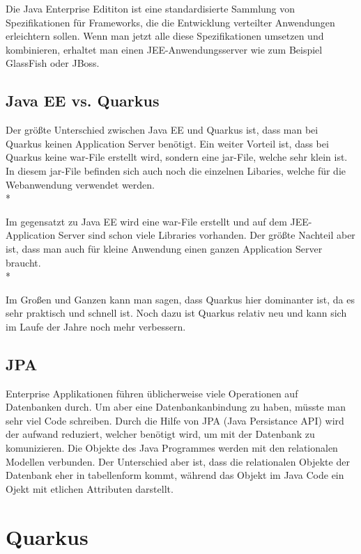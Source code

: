 Die Java Enterprise Edititon ist eine standardisierte Sammlung von Spezifikationen für Frameworks, die die Entwicklung verteilter Anwendungen erleichtern sollen.
Wenn man jetzt alle diese Spezifikationen umsetzen und kombinieren, erhaltet man einen JEE-Anwendungsserver wie zum Beispiel GlassFish oder JBoss. \cite{JavaEE}

\subsection{Java EE vs. Quarkus}
\author{David Ignjatovic} 

Der größte Unterschied zwischen Java EE und Quarkus ist, dass man bei Quarkus keinen Application Server benötigt. 
Ein weiter Vorteil ist, dass bei Quarkus keine war-File erstellt wird, sondern eine jar-File, welche sehr klein ist. 
In diesem jar-File befinden sich auch noch die einzelnen Libaries, welche für die Webanwendung verwendet werden. \\*

Im gegensatzt zu Java EE wird eine war-File erstellt und auf dem JEE-Application Server sind schon viele Libraries vorhanden. 
Der größte Nachteil aber ist, dass man auch für kleine Anwendung einen ganzen Application Server braucht. \\*

Im Großen und Ganzen kann man sagen, dass Quarkus hier dominanter ist, da es sehr praktisch und schnell ist. Noch dazu ist Quarkus relativ neu und kann sich im Laufe der Jahre noch mehr verbessern.


\subsection{JPA}
\author{David Ignjatovic} 

Enterprise Applikationen führen üblicherweise viele Operationen auf Datenbanken durch. Um aber eine Datenbankanbindung zu haben, müsste man sehr viel Code schreiben.
Durch die Hilfe von JPA (Java Persistance API) wird der aufwand reduziert, welcher benötigt wird, um mit der Datenbank zu komunizieren. 
Die Objekte des Java Programmes werden mit den relationalen Modellen verbunden. Der Unterschied aber ist, dass die relationalen Objekte der Datenbank eher in tabellenform kommt, während das Objekt im Java Code ein Ojekt mit etlichen Attributen darstellt. \cite{JPA}

\section{Quarkus}
\author{David Ignjatovic} 

